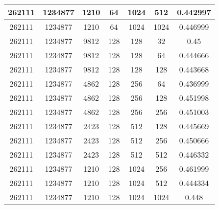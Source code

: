 \documentclass[9pt]{article}
\begin{document}
\begin{tabular}{|c|c|c|c|c|c|c| }
\hline
262111  & 1234877  & 1210  & 64  & 1024  & 512  & 0.442997 \\
\hline
262111  & 1234877  & 1210  & 64  & 1024  & 1024  & 0.446999 \\
\hline
262111  & 1234877  & 9812  & 128  & 128  & 32  & 0.45 \\
\hline
262111  & 1234877  & 9812  & 128  & 128  & 64  & 0.444666 \\
\hline
262111  & 1234877  & 9812  & 128  & 128  & 128  & 0.443668 \\
\hline
262111  & 1234877  & 4862  & 128  & 256  & 64  & 0.436999 \\
\hline
262111  & 1234877  & 4862  & 128  & 256  & 128  & 0.451998 \\
\hline
262111  & 1234877  & 4862  & 128  & 256  & 256  & 0.451003 \\
\hline
262111  & 1234877  & 2423  & 128  & 512  & 128  & 0.445669 \\
\hline
262111  & 1234877  & 2423  & 128  & 512  & 256  & 0.450666 \\
\hline
262111  & 1234877  & 2423  & 128  & 512  & 512  & 0.446332 \\
\hline
262111  & 1234877  & 1210  & 128  & 1024  & 256  & 0.461999 \\
\hline
262111  & 1234877  & 1210  & 128  & 1024  & 512  & 0.444334 \\
\hline
262111  & 1234877  & 1210  & 128  & 1024  & 1024  & 0.448 \\
\hline
\end{tabular}
 
\end{document}
